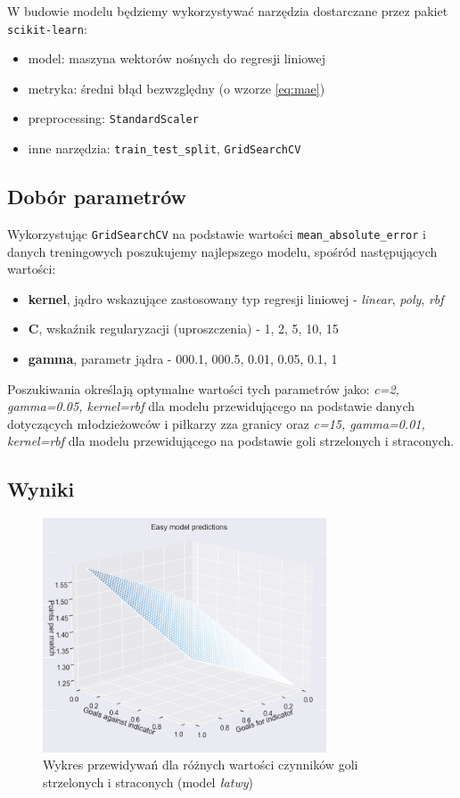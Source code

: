 \documentclass{article}
\newcommand{\pyobject}[1]{\texttt{#1}}
\begin{document}
W budowie modelu będziemy wykorzystywać narzędzia dostarczane przez pakiet \pyobject{scikit-learn}:
\begin{itemize}
    \item model: maszyna wektorów nośnych do regresji liniowej
    \item metryka: średni błąd bezwzględny (o wzorze \ref{eq:mae})
    \item preprocessing: \pyobject{StandardScaler}
    \item inne narzędzia: \pyobject{train\_test\_split}, \pyobject{GridSearchCV}
\end{itemize}

\subsection{Dobór parametrów}

Wykorzystując \pyobject{GridSearchCV} na podstawie wartości \pyobject{mean\_absolute\_error} i danych treningowych poszukujemy najlepszego modelu, spośród następujących wartości:
\begin{itemize}
    \item \textbf{kernel}, jądro wskazujące zastosowany typ regresji liniowej - \textit{linear}, \textit{poly}, \textit{rbf}
    \item \textbf{C}, wskaźnik regularyzacji (uproszczenia) - 1, 2, 5, 10, 15
    \item \textbf{gamma}, parametr jądra - 000.1, 000.5, 0.01, 0.05, 0.1, 1
\end{itemize}

Poszukiwania określają optymalne wartości tych parametrów jako: \textit{c=2, gamma=0.05, kernel=rbf} dla modelu przewidującego na podstawie danych dotyczących młodzieżowców i piłkarzy zza granicy oraz \textit{c=15, gamma=0.01, kernel=rbf} dla modelu przewidującego na podstawie goli strzelonych i straconych.

\subsection{Wyniki}

\begin{figure}[h!]
    \centering
    \includegraphics[width=0.75\textwidth]{3d.png}
    \caption{Wykres przewidywań dla różnych wartości czynników goli strzelonych i straconych (model \textit{łatwy})}
    \label{fig:3d}
\end{figure}
\end{document}
